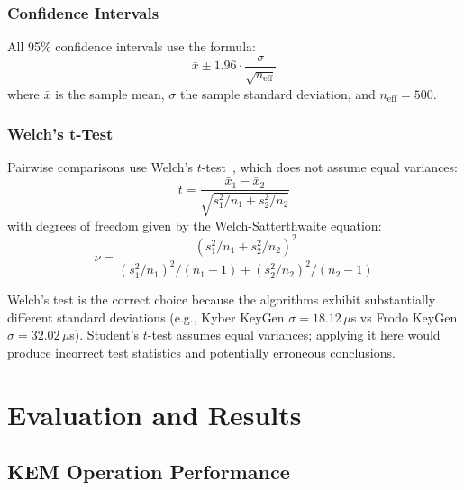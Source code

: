 \documentclass[12pt,a4paper]{report}
\begin{document}
\subsection{Confidence Intervals}

All 95\% confidence intervals use the formula:
\[
\bar{x} \pm 1.96 \cdot \frac{\sigma}{\sqrt{n_{\text{eff}}}}
\]
where $\bar{x}$ is the sample mean, $\sigma$ the sample standard deviation, and
$n_{\text{eff}} = 500$.

\subsection{Welch's t-Test}

Pairwise comparisons use Welch's $t$-test~\cite{peikert2016}, which does not assume
equal variances:
\[
t = \frac{\bar{x}_1 - \bar{x}_2}{\sqrt{s_1^2/n_1 + s_2^2/n_2}}
\]
with degrees of freedom given by the Welch-Satterthwaite equation:
\[
\nu = \frac{(s_1^2/n_1 + s_2^2/n_2)^2}
           {(s_1^2/n_1)^2/(n_1-1) + (s_2^2/n_2)^2/(n_2-1)}
\]

Welch's test is the correct choice because the algorithms exhibit substantially
different standard deviations (e.g., Kyber KeyGen $\sigma = 18.12\,\mu$s vs Frodo
KeyGen $\sigma = 32.02\,\mu$s). Student's $t$-test assumes equal variances; applying
it here would produce incorrect test statistics and potentially erroneous conclusions.

\chapter{Evaluation and Results}

\section{KEM Operation Performance}
\end{document}

